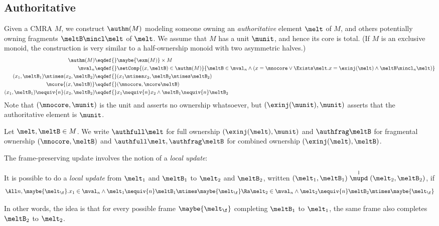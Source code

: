\subsection{Authoritative}
\label{sec:auth-cmra}

Given a CMRA $M$, we construct $\authm(M)$ modeling someone owning an \emph{authoritative} element $\melt$ of $M$, and others potentially owning fragments $\meltB \mincl \melt$ of $\melt$.
We assume that $M$ has a unit $\munit$, and hence its core is total.
(If $M$ is an exclusive monoid, the construction is very similar to a half-ownership monoid with two asymmetric halves.)
\begin{align*}
\authm(M) \eqdef{}& \maybe{\exm(M)} \times M \\
\mval_n \eqdef{}& \setComp{ (x, \meltB) \in \authm(M) }{ \meltB \in \mval_n \land (x = \mnocore \lor \Exists \melt. x = \exinj(\melt) \land \meltB \mincl_n \melt) } \\
  (x_1, \meltB_1) \mtimes (x_2, \meltB_2) \eqdef{}& (x_1 \mtimes x_2, \meltB_2 \mtimes \meltB_2) \\
  \mcore{(x, \meltB)} \eqdef{}& (\mnocore, \mcore\meltB) \\
  (x_1, \meltB_1) \nequiv{n} (x_2, \meltB_2) \eqdef{}& x_1 \nequiv{n} x_2 \land \meltB_1 \nequiv{n} \meltB_2
\end{align*}
Note that $(\mnocore, \munit)$ is the unit and asserts no ownership whatsoever, but $(\exinj(\munit), \munit)$ asserts that the authoritative element is $\munit$.

Let $\melt, \meltB \in M$.
We write $\authfull \melt$ for full ownership $(\exinj(\melt), \munit)$ and $\authfrag \meltB$ for fragmental ownership $(\mnocore, \meltB)$ and $\authfull \melt , \authfrag \meltB$ for combined ownership $(\exinj(\melt), \meltB)$.

The frame-preserving update involves the notion of a \emph{local update}:
\newcommand\lupd{\stackrel{\mathrm l}{\mupd}}
\begin{defn}
  It is possible to do a \emph{local update} from $\melt_1$ and $\meltB_1$ to $\melt_2$ and $\meltB_2$, written $(\melt_1, \meltB_1) \lupd (\melt_2, \meltB_2)$, if
  \[ \All n, \maybe{\melt_\f}. x_1 \in \mval_n \land \melt_1 \nequiv{n} \meltB_1 \mtimes \maybe{\melt_\f} \Ra \melt_2 \in \mval_n \land \melt_2 \nequiv{n} \meltB_2 \mtimes \maybe{\melt_\f} \]
\end{defn}
In other words, the idea is that for every possible frame $\maybe{\melt_\f}$ completing $\meltB_1$ to $\melt_1$, the same frame also completes $\meltB_2$ to $\melt_2$.

